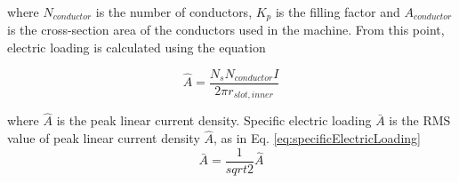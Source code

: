 \documentclass[a4paper, 11pt, titlepage]{article}
\begin{document}
where  $N_{conductor}$ is the number of conductors, $K_p$ is the filling factor and $A_{conductor}$ is the cross-section area of the conductors used in the machine. From this point, electric loading is calculated using the equation

\begin{equation}
	\hat{A}=\frac{N_sN_{conductor}I}{2\pi r_{slot,inner}}
	\label{eq:peakLinearCurrentDensity}
\end{equation}

where $\hat{A}$ is the peak linear current density. Specific electric loading $\bar{A}$ is the RMS value of peak linear current density $\hat{A}$, as in Eq. \ref{eq:specificElectricLoading}
\begin{equation}
	\bar{A}=\frac{1}{sqrt{2}}\hat{A}
	\label{eq:specificElectricLoading}
\end{equation}

\newpage

 

\end{document}
